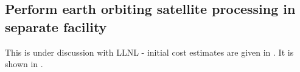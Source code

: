 
\subsection{Perform earth orbiting satellite processing in separate facility} \label{sec:5perform}
This is under discussion with LLNL - initial cost estimates are given in .
It is shown in .
